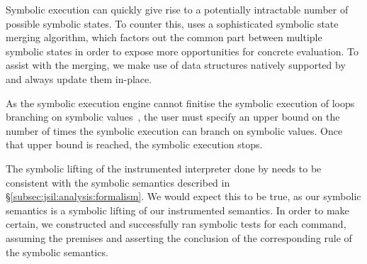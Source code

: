    

Symbolic execution can quickly give rise to a potentially intractable number of possible symbolic states. 
To counter this, \rosette uses a sophisticated 
symbolic state merging algorithm, which factors out the common 
part between multiple symbolic states in order to expose more 
opportunities for concrete evaluation.
To assist \rosette with the merging, we make use of 
data structures natively supported by \rosette and always update them 
in-place. 


 As the \jsil symbolic execution engine cannot
 finitise the symbolic execution of loops branching on symbolic values~\cite{abstract:symbolic:exec}, the user must specify 
 an upper bound on the number of times the symbolic execution can
 branch on symbolic values.
Once that upper bound is reached, the symbolic execution stops.  

 The symbolic lifting of the instrumented interpreter done by \rosette needs to be consistent with the symbolic semantics described in \S\ref{subsec:jsil:analysis:formalism}. We would expect this to be true, as our symbolic semantics is a symbolic lifting of our instrumented semantics. In order to make certain, we constructed and successfully ran symbolic tests for each \jsil command, assuming the premises and asserting the conclusion of the corresponding rule of the symbolic semantics.


